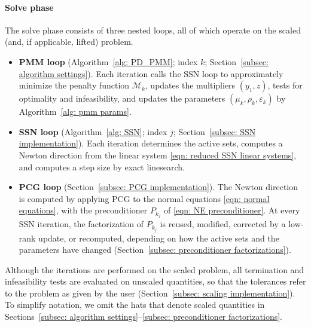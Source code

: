 \paragraph{Solve phase} The solve phase consists of three nested loops, all of which operate on the scaled (and, if applicable, lifted) problem.
\begin{itemize}
    \item \textbf{PMM loop} (Algorithm~\ref{alg: PD_PMM}; index $k$; Section~\ref{subsec: algorithm settings}). Each iteration calls the SSN loop to approximately minimize the penalty function $\mathcal{M}_k$, updates the multipliers $(y_1,z)$, tests for optimality and infeasibility, and updates the parameters $(\mu_k,\rho_k,\varepsilon_k)$ by Algorithm~\ref{alg: pmm params}.
    \item \textbf{SSN loop} (Algorithm~\ref{alg: SSN}; index $j$; Section~\ref{subsec: SSN implementation}). Each iteration determines the active sets, computes a Newton direction from the linear system \eqref{eqn: reduced SSN linear systems}, and computes a step size by exact linesearch.
    \item \textbf{PCG loop} (Section~\ref{subsec: PCG implementation}). The Newton direction is computed by applying PCG to the normal equations \eqref{eqn: normal equations}, with the preconditioner $P_{k_j}$ of \eqref{eqn: NE preconditioner}. At every SSN iteration, the factorization of $P_{k_j}$ is reused, modified, corrected by a low-rank update, or recomputed, depending on how the active sets and the parameters have changed (Section~\ref{subsec: preconditioner factorizations}).
\end{itemize}
Although the iterations are performed on the scaled problem, all termination and infeasibility tests are evaluated on unscaled quantities, so that the tolerances refer to the problem as given by the user (Section~\ref{subsec: scaling implementation}). To simplify notation, we omit the hats that denote scaled quantities in Sections~\ref{subsec: algorithm settings}--\ref{subsec: preconditioner factorizations}.

